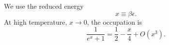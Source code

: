 \documentclass{article}
\begin{document}
We use the reduced energy
\begin{equation}
x \equiv \beta\epsilon .
\label{eq:x}
\end{equation}
At high temperature, $x \to 0$, the occupation is
\begin{equation}
\frac{1}{e^{x}+1} = \frac{1}{2} - \frac{x}{4} + O(x^3) .
\label{eq:ht}
\end{equation}
\end{document}
